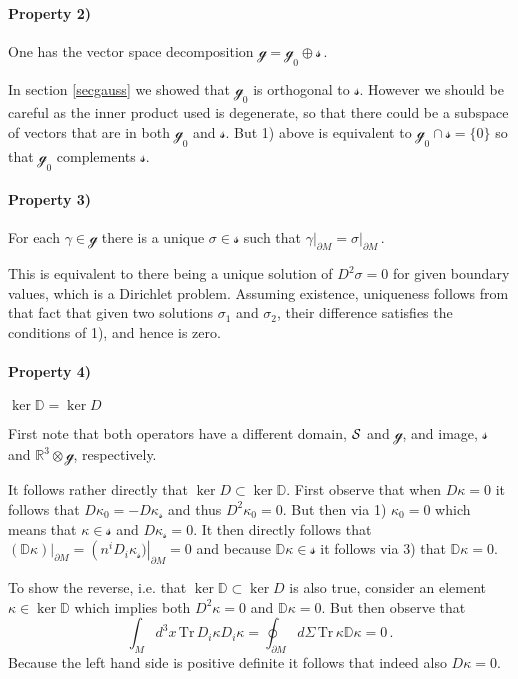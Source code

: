 \documentclass[11pt,a4paper]{article}
\def\calsg{{\boldsymbol{\mathscr g}}}
\def\cals{{\cal S}}
\def\calss{{\boldsymbol{\mathscr s}}}
\def\Tr{\mathrm{Tr}}
\def\Dperp{{\mathbb{D}}}
\begin{document}
     
     
      \paragraph{Property 2)} One has the vector space decomposition $\calsg=\calsg_0\oplus\calss$\,.
   
     In section \ref{secgauss} we showed that $\calsg_0$ is orthogonal to $\calss$. However we should be careful as the inner product used is degenerate, so that there could be a subspace of vectors that are in both $\calsg_0$ and $\calss$. But 1) above is equivalent to $\calsg_0\cap\calss=\{0\}$ so that $\calsg_0$ complements $\calss$.
     
      \paragraph{Property 3)}For each $\gamma\in\calsg$ there is a unique $\sigma\in\calss$ such that $\left.\gamma\right|_{\partial M}=\left.\sigma\right|_{\partial M}$\,.
     
     This is equivalent to there being a unique solution of $D^2\sigma=0$ for given boundary values, which is a Dirichlet problem. Assuming existence, uniqueness follows from that fact that given two solutions $\sigma_1$ and $\sigma_2$, their difference satisfies the conditions of 1), and hence is zero.
     
     
     \paragraph{Property 4)} $\ker \Dperp=\ker D$
      
     First note that both operators have a different domain, $\cals$ and $\calsg$, and image, $\calss$ and $\mathbb{R}^3\otimes \calsg$, respectively. 
     
     It follows rather directly that $\ker D\subset \ker \Dperp$. First observe that when $D\kappa=0$ it follows that $D\kappa_0=-D\kappa_\calss$ and thus $D^2\kappa_0=0$. But then via 1) $\kappa_0=0$ which means that $\kappa\in\calss$ and $D\kappa_\calss=0$. It then directly follows that $\left.(\Dperp \kappa)\right|_{\partial M}=\left(n^iD_{i}\kappa_\calss)\right|_{\partial M}=0$ and because $\Dperp\kappa\in\calss$ it follows via 3) that $\Dperp\kappa=0$. 
     
     To show the reverse, i.e. that $\ker \Dperp\subset \ker D$  is also true, consider an element $\kappa\in \ker \Dperp$ which implies both $D^2\kappa=0$ and $\Dperp\kappa=0$. But then observe that 
     \begin{equation}
     \int_M\!d^3x\,
    \Tr\,D_{i}\kappa D_{i}\kappa= \oint_{\partial M}\!\!d\Sigma \,\Tr\,\kappa\Dperp\kappa=0\,.
     \end{equation}
     Because the left hand side is positive definite it follows that indeed also $D\kappa=0$.
     
\end{document}
